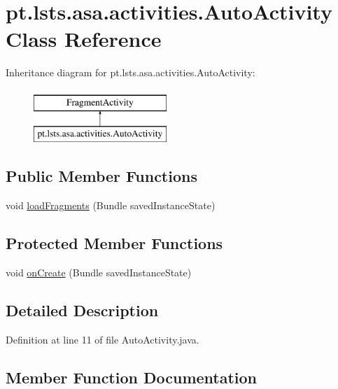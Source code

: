 \hypertarget{classpt_1_1lsts_1_1asa_1_1activities_1_1AutoActivity}{}\section{pt.\+lsts.\+asa.\+activities.\+Auto\+Activity Class Reference}
\label{classpt_1_1lsts_1_1asa_1_1activities_1_1AutoActivity}
Inheritance diagram for pt.\+lsts.\+asa.\+activities.\+Auto\+Activity\+:\begin{figure}[H]
\begin{center}
\leavevmode
\includegraphics[height=2.000000cm]{classpt_1_1lsts_1_1asa_1_1activities_1_1AutoActivity}
\end{center}
\end{figure}
\subsection*{Public Member Functions}
\begin{DoxyCompactItemize}
\item 
void \hyperlink{classpt_1_1lsts_1_1asa_1_1activities_1_1AutoActivity_aa9c394d0e0674bdce5de46cb0c1e0550}{load\+Fragments} (Bundle saved\+Instance\+State)
\end{DoxyCompactItemize}
\subsection*{Protected Member Functions}
\begin{DoxyCompactItemize}
\item 
void \hyperlink{classpt_1_1lsts_1_1asa_1_1activities_1_1AutoActivity_a9a2d4c8b25b59bc9b86e7d460f7b5181}{on\+Create} (Bundle saved\+Instance\+State)
\end{DoxyCompactItemize}


\subsection{Detailed Description}


Definition at line 11 of file Auto\+Activity.\+java.



\subsection{Member Function Documentation}
\hypertarget{classpt_1_1lsts_1_1asa_1_1activities_1_1AutoActivity_aa9c394d0e0674bdce5de46cb0c1e0550}{}
